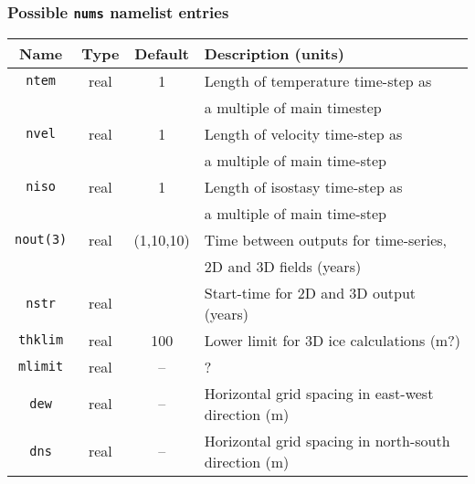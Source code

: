 \subsubsection{Possible \texttt{nums} namelist entries}
%
\begin{center}
\begin{tabular}{|c|c|c|l|}
\hline
Name & Type & Default & Description (units)\\
\hline
\hline
\texttt{ntem}    & real & 1 & Length of temperature time-step as \\
 & & & a multiple of main timestep \\
\hline
\texttt{nvel}    & real & 1 & Length of velocity time-step as \\
 & & & a multiple of main time-step\\
\hline
\texttt{niso}    & real & 1 & Length of isostasy time-step as \\
 & & & a multiple of main time-step\\
\hline
\texttt{nout(3)} & real & (1,10,10) & Time between outputs for time-series, \\
 & & & 2D and 3D fields (years)\\
\hline
\texttt{nstr}    & real & & Start-time for 2D and 3D output (years) \\
\hline
\texttt{thklim} & real & 100 & Lower limit for 3D ice calculations (m?) \\
\hline
\texttt{mlimit} & real & -- & ? \\
\hline
\texttt{dew} & real & -- & Horizontal grid spacing in east-west direction (m)
\\
\hline
\texttt{dns} & real & -- & Horizontal grid spacing in north-south direction (m) \\
\hline
\end{tabular}
\end{center}
%

